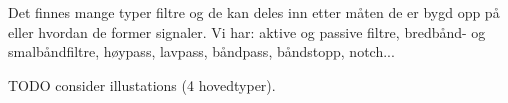 Det finnes mange typer filtre og de kan deles inn etter måten de er bygd opp på
eller hvordan de former signaler.
Vi har: aktive og passive filtre, bredbånd- og smalbåndfiltre,
høypass, lavpass, båndpass, båndstopp, notch...

TODO consider illustations (4 hovedtyper).

